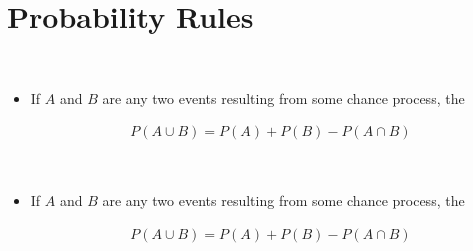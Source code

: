 \documentclass[Main.tex]{subfiles}
\begin{document}
	\section{Probability Rules}	
	\begin{example} \hfill \\
		\begin{itemize}	
			\item If $A$ and $B$ are any two events resulting from some chance process, the
			\begin{definition}
				\begin{subequations}
					\begin{align}
						P(A\cup B)=P(A)+P(B)-P(A\cap B)	
					\end{align}
				\end{subequations}
			\end{definition}\hfill									
		\end{itemize}
	\end{example}												
	
	\begin{example} \hfill \\
		\begin{itemize}	
			\item If $A$ and $B$ are any two events resulting from some chance process, the
			\begin{definition}
				\begin{subequations}
					\begin{align}
						P(A\cup B)=P(A)+P(B)-P(A\cap B)	
					\end{align}
				\end{subequations}
			\end{definition}\hfill									
		\end{itemize}
	\end{example}
	
\end{document}
